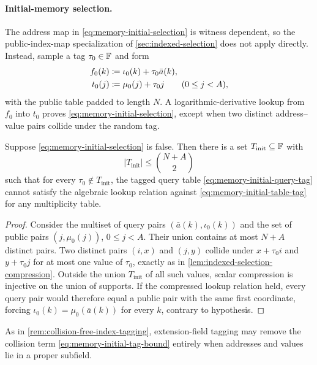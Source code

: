 \paragraph{Initial-memory selection.}
The address map in \eqref{eq:memory-initial-selection} is witness dependent, so the public-index-map specialization of \cref{sec:indexed-selection} does not apply directly.  Instead, sample a tag $\tau_0\in\mathbb{F}$ and form
\begin{align}
  f_0(k)&\coloneqq \iota_0(k)+\tau_0\bar a(k),
  \label{eq:memory-initial-query-tag}\\
  t_0(j)&\coloneqq \mu_0(j)+\tau_0 j
  \qquad(0\le j<A),
  \label{eq:memory-initial-table-tag}
\end{align}
with the public table padded to length $N$.  A logarithmic-derivative lookup from $f_0$ into $t_0$ proves \eqref{eq:memory-initial-selection}, except when two distinct address--value pairs collide under the random tag.

\begin{lemma}
\label{lem:memory-initial-selection}
Suppose \eqref{eq:memory-initial-selection} is false.  Then there is a set $T_{\mathrm{init}}\subseteq\mathbb{F}$ with
\begin{equation}
  |T_{\mathrm{init}}|
  \le\binom{N+A}{2}
  \label{eq:memory-initial-tag-bound}
\end{equation}
such that for every $\tau_0\notin T_{\mathrm{init}}$, the tagged query table \eqref{eq:memory-initial-query-tag} cannot satisfy the algebraic lookup relation against \eqref{eq:memory-initial-table-tag} for any multiplicity table.
\end{lemma}

\begin{proof}
Consider the multiset of query pairs $(\bar a(k),\iota_0(k))$ and the set of public pairs $(j,\mu_0(j))$, $0\le j<A$.  Their union contains at most $N+A$ distinct pairs.  Two distinct pairs $(i,x)$ and $(j,y)$ collide under $x+\tau_0 i$ and $y+\tau_0 j$ for at most one value of $\tau_0$, exactly as in \cref{lem:indexed-selection-compression}.  Outside the union $T_{\mathrm{init}}$ of all such values, scalar compression is injective on the union of supports.  If the compressed lookup relation held, every query pair would therefore equal a public pair with the same first coordinate, forcing $\iota_0(k)=\mu_0(\bar a(k))$ for every $k$, contrary to hypothesis.
\end{proof}

As in \cref{rem:collision-free-index-tagging}, extension-field tagging may remove the collision term \eqref{eq:memory-initial-tag-bound} entirely when addresses and values lie in a proper subfield.

